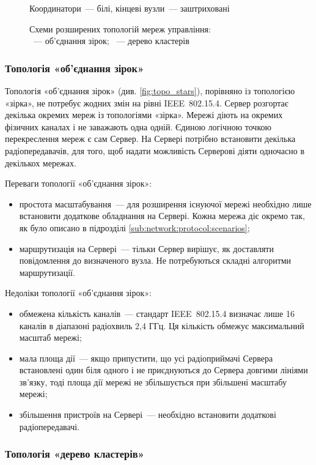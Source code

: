 \documentclass[a4paper,ukrainian,utf8,nocolumnsxix,nocolumnxxxii,nocolumnxxxi,floatsection,equationsection]{eskdtext}
\renewcommand\paragraph{\subsubsection}
\newcommand{\iee}[0]{IEEE~802.15.4\xspace}
\begin{document}
\begin{figure}[htb]
{{		}
	}
	\caption*{Координатори~--- білі, кінцеві вузли~--- заштриховані}
	\caption{\label{fig:expansion:topologies}Схеми розширених топологій мереж управління:\\
		\protect{}~--- об'єднання зірок; \protect{}~--- дерево кластерів
	}
\end{figure}

\paragraph{Топологія «об'єднання зірок»}

Топологія «об'єднання зірок» (див. \cref{fig:topo_stars}), порівняно із топологією «зірка», не потребує жодних змін на рівні \iee. Сервер розгортає декілька окремих мереж із топологіями «зірка». Мережі діють на окремих фізичних каналах і не заважають одна одній. Єдиною логічною точкою перекреслення мереж є сам Сервер. На Сервері потрібно встановити декілька радіопередавачів, для того, щоб надати можливість Серверові діяти одночасно в декількох мережах.

Переваги топології «об'єднання зірок»:
\begin{itemize}
	\item простота масштабування~--- для розширення існуючої мережі необхідно лише встановити додаткове обладнання на Сервері. Кожна мережа діє окремо так, як було описано в підрозділі \ref{sub:network:protocol:scenarios};
	\item маршрутизація на Сервері~--- тільки Сервер вирішує, як доставляти повідомлення до визначеного вузла. Не потребуються складні алгоритми маршрутизації.
\end{itemize}

Недоліки топології «об'єднання зірок»:
\begin{itemize}
	\item обмежена кількість каналів~--- стандарт \iee визначає лише 16 каналів в діапазоні радіохвиль 2,4 ГГц. Ця кількість обмежує максимальний масштаб мережі;
	\item мала площа дії~--- якщо припустити, що усі радіоприймачі Сервера встановлені один біля одного і не приєднуються до Сервера довгими лініями зв'язку, тоді площа дії мережі не збільшується при збільшені масштабу мережі;
	\item збільшення пристроїв на Сервері~--- необхідно встановити додаткові радіопередавачі.
\end{itemize}

\paragraph{Топологія «дерево кластерів»}
\end{document}
